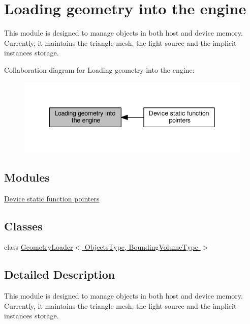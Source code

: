 \hypertarget{group__geometry__loading}{}\section{Loading geometry into the engine}
\label{group__geometry__loading}


This module is designed to manage objects in both host and device memory. Currently, it maintains the triangle mesh, the light source and the implicit instances storage.  


Collaboration diagram for Loading geometry into the engine\+:
\nopagebreak
\begin{figure}[H]
\begin{center}
\leavevmode
\includegraphics[width=341pt]{group__geometry__loading}
\end{center}
\end{figure}
\subsection*{Modules}
\begin{DoxyCompactItemize}
\item 
\hyperlink{group__device__pointers}{Device static function pointers}
\end{DoxyCompactItemize}
\subsection*{Classes}
\begin{DoxyCompactItemize}
\item 
class \hyperlink{class_geometry_loader}{Geometry\+Loader$<$ Objects\+Type, Bounding\+Volume\+Type $>$}
\end{DoxyCompactItemize}


\subsection{Detailed Description}
This module is designed to manage objects in both host and device memory. Currently, it maintains the triangle mesh, the light source and the implicit instances storage. 

